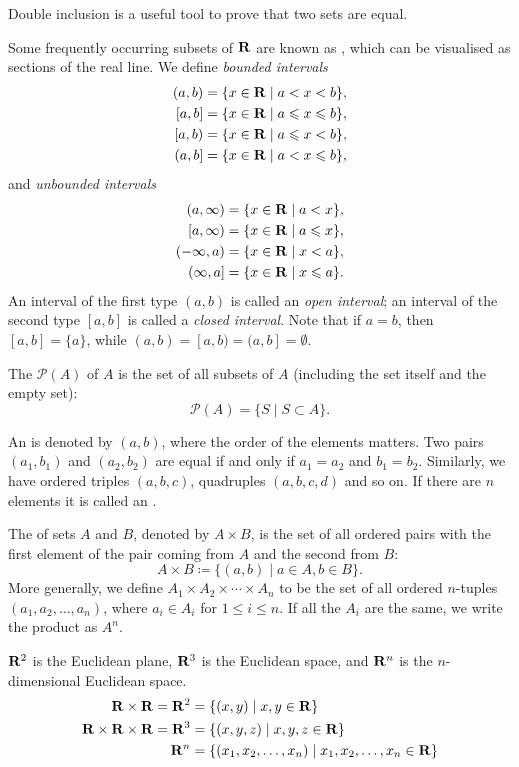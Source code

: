 \begin{remark}
Double inclusion is a useful tool to prove that two sets are equal.
\end{remark}

Some frequently occurring subsets of $\mathbf R$ are known as , which can be visualised as sections of the real line. We define \emph{bounded intervals}
\begin{align*}
(a,b)&=\{x\in\RR\mid a<x<b\},\\
[a,b]&=\{x\in\RR\mid a\le x\le b\},\\
[a,b)&=\{x\in\RR\mid a\le x<b\},\\
(a,b]&=\{x\in\RR\mid a<x\le b\},
\end{align*}
and \emph{unbounded intervals}
\begin{align*}
(a,\infty)&=\{x\in\RR\mid a<x\},\\
[a,\infty)&=\{x\in\RR\mid a\le x\},\\
(-\infty,a)&=\{x\in\RR\mid x<a\},\\
(\infty,a]&=\{x\in\RR\mid x\le a\}.
\end{align*}
An interval of the first type $(a,b)$ is called an \emph{open interval}; an interval of the second type $[a,b]$ is called a \emph{closed interval}. Note that if $a=b$, then $[a,b]=\{a\}$, while $(a,b)=[a,b)=(a,b]=\emptyset$.

The  $\mathcal{P}(A)$ of $A$ is the set of all subsets of $A$ (including the set itself and the empty set):
\[\mathcal{P}(A)=\{S\mid S\subset A\}.\]

An  is denoted by $(a,b)$, where the order of the elements matters. Two pairs $(a_1,b_1)$ and $(a_2,b_2)$ are equal if and only if $a_1=a_2$ and $b_1=b_2$.  Similarly, we have ordered triples $(a,b,c)$, quadruples $(a,b,c,d)$ and so on. If there are $n$ elements it is called an .

The  of sets $A$ and $B$, denoted by $A \times B$, is the set of all ordered pairs with the first element of the pair coming from $A$ and the second from $B$:
\[A\times B\coloneqq\{(a,b)\mid a\in A,b\in B\}.\]
More generally, we define $A_1 \times A_2 \times \cdots \times A_n$ to be the set of all ordered $n$-tuples $(a_1, a_2, \dots, a_n)$, where $a_i \in A_i$ for $1 \le i \le n$. If all the $A_i$ are the same, we write the product as $A^n$.

\begin{example}
$\mathbf R^2$ is the Euclidean plane, $\mathbf R^3$ is the Euclidean space, and $\mathbf R^n$ is the $n$-dimensional Euclidean space.
\begin{align*}
\mathbf R \times \mathbf R = \mathbf R^2 &= \{(x,y) \mid x,y \in \mathbf R\} \\
\mathbf R \times \mathbf R \times \mathbf R = \mathbf R^3 &= \{(x,y,z) \mid x,y,z \in \mathbf R\} \\
\mathbf R^n &= \{(x_1,x_2,\dots,x_n) \mid x_1,x_2,\dots,x_n \in \mathbf R\}
\end{align*}
\end{example}

